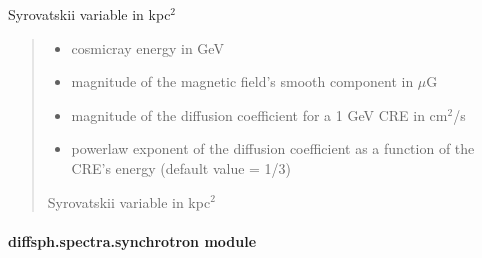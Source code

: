 \documentclass[letterpaper,10pt,english]{sphinxmanual}
\begin{document}
\begin{fulllineitems}
\label{\detokenize{diffsph.spectra:diffsph.spectra.analytics.lam}}
\pysigstartsignatures
{}
\pysigstopsignatures
\sphinxAtStartPar
Syrovatskii variable in kpc$^{\text{2}}$
\begin{quote}\begin{description}
\begin{itemize}
\item {} 
\sphinxAtStartPar
{} \textendash{} cosmic\sphinxhyphen{}ray energy in GeV

\item {} 
\sphinxAtStartPar
{} \textendash{} magnitude of the magnetic field’s smooth component in \(\mu\)G

\item {} 
\sphinxAtStartPar
{} \textendash{} magnitude of the diffusion coefficient for a 1 GeV CRE in cm$^{\text{2}}$/s

\item {} 
\sphinxAtStartPar
{} \textendash{} power\sphinxhyphen{}law exponent of the diffusion coefficient as a function of the CRE’s energy (default value = 1/3)

\end{itemize}

\sphinxAtStartPar
Syrovatskii variable in kpc$^{\text{2}}$

\end{description}\end{quote}

\end{fulllineitems}



\paragraph{diffsph.spectra.synchrotron module}
\label{\detokenize{diffsph.spectra:module-diffsph.spectra.synchrotron}}\label{\detokenize{diffsph.spectra:diffsph-spectra-synchrotron-module}}
\end{document}
